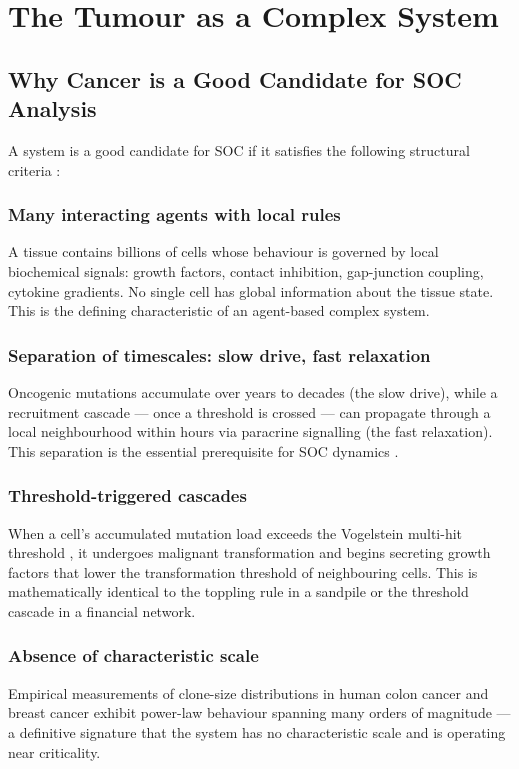 \documentclass[12pt,a4paper]{article}
\begin{document}
\section{The Tumour as a Complex System}

\subsection{Why Cancer is a Good Candidate for SOC Analysis}

A system is a good candidate for SOC if it satisfies the following structural
criteria \citep{bak1996how, jensen1998self}:

\subsubsection{Many interacting agents with local rules}
A tissue contains billions of cells whose behaviour is governed by local
biochemical signals: growth factors, contact inhibition, gap-junction coupling,
cytokine gradients.  No single cell has global information about the tissue
state.  This is the defining characteristic of an agent-based complex system.

\subsubsection{Separation of timescales: slow drive, fast relaxation}
Oncogenic mutations accumulate over years to decades (the slow drive), while
a recruitment cascade --- once a threshold is crossed --- can propagate through
a local neighbourhood within hours via paracrine signalling (the fast
relaxation).  This separation is the essential prerequisite for SOC dynamics
\citep{bak1987self}.

\subsubsection{Threshold-triggered cascades}
When a cell's accumulated mutation load exceeds the Vogelstein multi-hit
threshold \citep{vogelstein2013cancer}, it undergoes malignant transformation
and begins secreting growth factors that lower the transformation threshold of
neighbouring cells.  This is mathematically identical to the toppling rule in
a sandpile or the threshold cascade in a financial network.

\subsubsection{Absence of characteristic scale}
Empirical measurements of clone-size distributions in human colon cancer
\citep{sottoriva2015big} and breast cancer \citep{yates2015subclonal} exhibit
power-law behaviour spanning many orders of magnitude --- a definitive signature
that the system has no characteristic scale and is operating near criticality.
\end{document}
